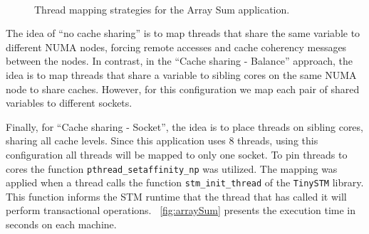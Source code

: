 \begin{figure}[ht]
	\centering
	\\
	\caption{Thread mapping strategies for the Array Sum application.}
	\label{fig:MappingStrategyArraySum}
\end{figure}

The idea of ``no cache sharing'' is to map threads that share the same variable to different NUMA nodes, forcing remote accesses and cache coherency messages between the nodes. In contrast, in the ``Cache sharing - Balance'' approach, the idea is to map threads that share a variable to sibling cores on the same NUMA node to share caches. However, for this configuration we map each pair of shared variables to different sockets.


Finally, for ``Cache sharing - Socket'', the idea is to place threads on sibling cores, sharing all cache levels. Since this application uses 8 threads, using this configuration all threads will be mapped to only one socket. To pin threads to cores the function \texttt{pthread\_setaffinity\_np} was utilized. The mapping was applied when a thread calls the function \texttt{stm\_init\_thread} of the \texttt{TinySTM} library. This function informs the STM runtime that the thread that has called it will perform transactional operations. \figurename~\ref{fig:arraySum} presents the execution time in seconds on each machine.



